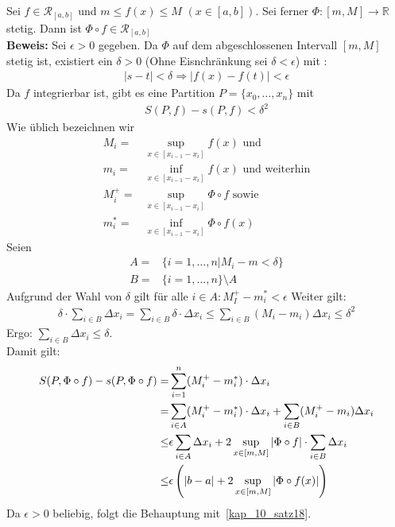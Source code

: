 \begin{Satz}{\label{vl_11_satz23}
	Sei $f \in \mathcal{R}_{[a,b]}$ und $m \leq f(x) \leq M$ $ (x \in [a,b])$.
	Sei ferner  \linebreak $\Phi : [m, M] \rightarrow \mathbb{R}$ stetig. 
	Dann ist $\Phi \circ f \in \mathcal{R}_{[a,b]}$ \\
	\textbf{Beweis:} Sei $\epsilon > 0$ gegeben. Da $\Phi$ auf dem abgeschlossenen Intervall 
	$[m,M]$ stetig ist, existiert ein $\delta > 0$ 
	(Ohne Eisnchränkung sei $\delta < \epsilon$) mit :
	\begin{align*}
		\vert s - t\vert < \delta \Rightarrow \vert f(x) - f(t) \vert < \epsilon
	\end{align*}
	Da $f$ integrierbar ist, gibt es eine Partition $P = \{x_0, \hdots, x_n\}$
	mit 
	\begin{align*}
		S(P,f) - s(P,f) < \delta^2
	\end{align*}		
	Wie üblich bezeichnen wir 
	\begin{align*}
		M_i = & \sup_{x \in [x_{i-1}-x_i]} f(x) \text{ und } \\
		m_i = & \inf_{x \in [x_{i-1}-x_i]} f(x) \text{ und weiterhin} \\
		M_i^+ = & \sup_{x \in [x_{i-1}-x_i]} \Phi \circ f \text{ sowie } \\
		m_i^* = & \inf_{x \in [x_{i-1}-x_i]} \Phi \circ f(x)
	\end{align*}		
	Seien
	\begin{align*}
		A = & \{i = 1, \hdots, n \vert M_i -m < \delta \} \\
		B = & \{ i = 1, \hdots, n\} \setminus A
	\end{align*}
	Aufgrund der Wahl von $\delta$ gilt für alle $ i \in A: M_I^+ - m_i^* < \epsilon$
	Weiter gilt: 
	\begin{align*}
		\delta \cdot \sum_{i \in B} \Delta x_i = \sum_{i \in B} \delta \cdot \Delta x_i 
		\leq  \sum_{i \in B} (M_i - m_i) \Delta x_i \leq \delta^2
	\end{align*}
	Ergo: $\sum_{i \in B} \Delta x_i \leq \delta$. \\
	Damit gilt:
	\begin{align*}
		S(P, \Phi \circ f) - s(P, \Phi \circ f) = 
		& \sum_{i = 1}^n (M_i^+ - m_i^*) \cdot\Delta x_i  \\
		= & \sum_{i \in A} (M_i^+ - m_i^* ) \cdot \Delta x_i + 
			\sum_{i \in B} (M_i^+ -m_i) \Delta x_i \\
		\leq & \epsilon \sum_{i \in A}\Delta x_i + 2 \sup_{x \in [m,M]} \abs{
			\Phi \circ f} \cdot \sum_{i \in B} \Delta x_i \\
		\leq & \epsilon \left(|b-a| + 2\sup_{x \in [m,M]} \abs{\Phi \circ f(x)}\right)
	\end{align*}
	Da $\epsilon > 0$ beliebig, folgt die Behauptung mit~\ref{kap_10_satz18}.
}\end{Satz}


